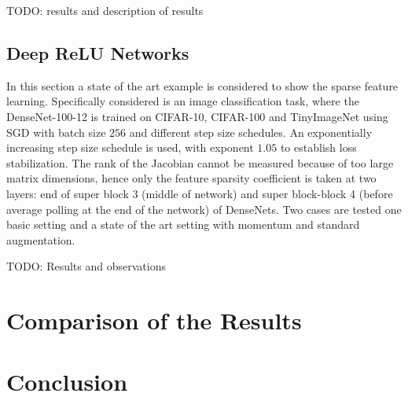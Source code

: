 TODO: results and description of results

\subsection{Deep ReLU Networks}
In this section a state of the art example is considered to show the sparse
feature learning. Specifically considered is an image classification task,
where the DenseNet-100-12 is trained on CIFAR-10, CIFAR-100 and TinyImageNet
using SGD with batch size $256$ and different step size schedules. An
exponentially increasing step size schedule is used, with exponent $1.05$ to
establish loss stabilization. The rank of the Jacobian cannot be measured
because of too large matrix dimensions, hence only the feature sparsity
coefficient is taken at two layers: end of super block 3 (middle of network)
and super block-block 4 (before average polling at the end of the network) of
DenseNets. Two cases are tested one basic setting and a state of the art
setting with momentum and standard augmentation.

TODO: Results and observations


\section{Comparison of the Results}

\section{Conclusion}



\nocite{andriushchenko2023sgd}
\nocite{shalev2014understanding}
\nocite{fast_armijo_2022}
\printbibliography


